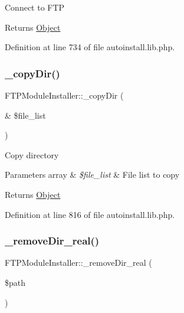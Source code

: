 Connect to F\+TP

\begin{DoxyReturn}{Returns}
\hyperlink{classObject}{Object} 
\end{DoxyReturn}


Definition at line 734 of file autoinstall.\+lib.\+php.

\mbox{\label{classFTPModuleInstaller_a48e7b724a4daa35a71163855add13532}} 
\subsubsection{\texorpdfstring{\+\_\+copy\+Dir()}{\_copyDir()}}
{\footnotesize\ttfamily F\+T\+P\+Module\+Installer\+::\+\_\+copy\+Dir (\begin{DoxyParamCaption}\item[{\&}]{\$file\+\_\+list }\end{DoxyParamCaption})}

Copy directory


\begin{DoxyParams}[1]{Parameters}
array & {\em \$file\+\_\+list} & File list to copy \\
\hline
\end{DoxyParams}
\begin{DoxyReturn}{Returns}
\hyperlink{classObject}{Object} 
\end{DoxyReturn}


Definition at line 816 of file autoinstall.\+lib.\+php.

\mbox{\label{classFTPModuleInstaller_a069e2b098a7b06dfcf65bedf41c0fa0c}} 
\subsubsection{\texorpdfstring{\+\_\+remove\+Dir\+\_\+real()}{\_removeDir\_real()}}
{\footnotesize\ttfamily F\+T\+P\+Module\+Installer\+::\+\_\+remove\+Dir\+\_\+real (\begin{DoxyParamCaption}\item[{}]{\$path }\end{DoxyParamCaption})}

